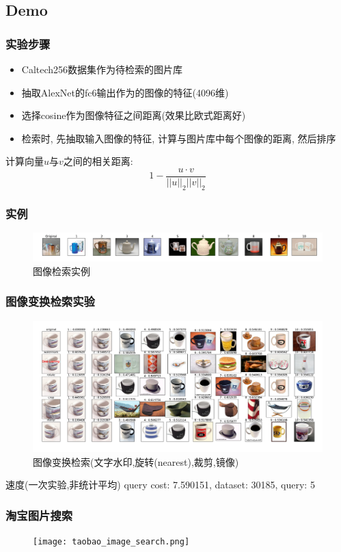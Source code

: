 \documentclass[table]{beamer}
\begin{document}
\subsection{Demo}
\begin{frame}
	\frametitle{实验步骤}
	\begin{itemize}
		\item Caltech256数据集作为待检索的图片库
		\item 抽取AlexNet的fc6输出作为的图像的特征(4096维)
		\item 选择cosine作为图像特征之间距离(效果比欧式距离好)
		\item 检索时, 先抽取输入图像的特征, 计算与图片库中每个图像的距离, 然后排序
	\end{itemize}
	计算向量$u$与$v$之间的相关距离:
	\begin{equation}
		1 - \frac{u \cdot v}{||u||_2||v||_2}
	\end{equation}
\end{frame}
\begin{frame}
	\frametitle{实例}
	\begin{figure}
		\includegraphics[width=\textwidth]{mug_search_result.pdf}
		\caption{图像检索实例}
		\label{}
	\end{figure}
\end{frame}
\begin{frame}
	\frametitle{图像变换检索实验}
	\begin{figure}
		\includegraphics[width=\textwidth]{search_result.pdf}
		\caption{图像变换检索(文字水印,旋转(nearest),裁剪,镜像)}
		\label{}
	\end{figure}
	\tiny{速度(一次实验,非统计平均) query cost: 7.590151, dataset: 30185, query: 5}\\
	{\color{red}{现场演示(visual\_search.py)......}}
\end{frame}
\begin{frame}
	\frametitle{淘宝图片搜索}
	\begin{figure}
		\texttt{[image: taobao\_image\_search.png]}
		\caption{}
		\label{}
	\end{figure}
\end{frame}
\end{document}
